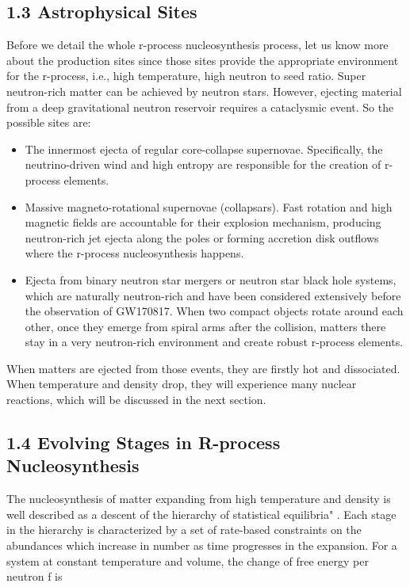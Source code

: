 \documentclass[aps,prl,preprint,groupedaddress]{revtex4}
\begin{document}
\subsection{1.3 Astrophysical Sites}\label{sec:astro}
Before we detail the whole r-process nucleosynthesis process, let us know more about the production sites since those sites provide the appropriate environment for the r-process, i.e., high temperature, high neutron to seed ratio. Super neutron-rich matter can be achieved by neutron stars. However, ejecting material from a deep gravitational neutron reservoir requires a cataclysmic event. So the possible sites are:
\begin{itemize}
\item 
The innermost ejecta of regular core-collapse supernovae. Specifically, the neutrino-driven wind and high entropy are responsible for the creation of r-process elements. 
\item Massive magneto-rotational supernovae (collapsars). Fast rotation and high magnetic fields are accountable for their explosion mechanism, producing neutron-rich jet ejecta along the poles or forming accretion disk outflows where the r-process nucleosynthesis happens.   
\item Ejecta from binary neutron star mergers or neutron
star black hole systems, which are naturally neutron-rich and have been considered extensively before the observation of GW170817. When two compact objects rotate around each other, once they emerge from spiral arms after the collision, matters there stay in a very neutron-rich environment and create robust r-process elements.
\end{itemize}
When matters are ejected from those events, they are firstly hot and dissociated. When temperature and density drop, they will experience many nuclear reactions, which will be discussed in the next section. 

\subsection{1.4 Evolving Stages in R-process Nucleosynthesis}
The nucleosynthesis of matter expanding from high temperature and density is well described as a descent of the hierarchy of statistical equilibria" \cite{1998PhRvC..58.3696M}. Each stage in the hierarchy is characterized by a set of rate-based constraints on the abundances which increase in number as time progresses in the expansion. For a system at constant temperature and volume, the change of free energy per neutron f is
\end{document}
